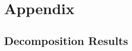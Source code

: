 \documentclass[11pt]{article}
\begin{document}
\appendix
\setcounter{table}{0}
\setcounter{figure}{0}
\setcounter{equation}{0}
\renewcommand\thetable{\Alph{section}.\arabic{table}}
\renewcommand\thefigure{\Alph{section}.\arabic{figure}}
\renewcommand\theequation{\Alph{section}.\arabic{equation}}%

\newpage


\section{Appendix}

\subsection{Decomposition Results}
\vspace{-.5cm}
\singlespacing
\end{document}
